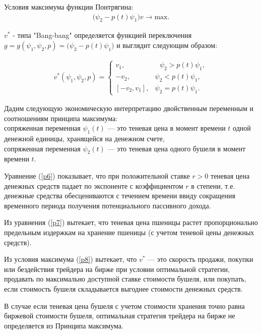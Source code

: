 {Условия максимума функции Понтрягина:
\begin{align}
     \big (\psi_{2} - p(t)\psi_{1}\big )v \to \mathrm{max}.
\end{align}


${v^*}$ - типа "Bang-bang" определяется функцией переключения\\
$g = g(\psi_1 , \psi_2, p)= \big (\psi_{2} - p(t)\psi_{1} \big)$ и выглядит следующим образом:

\begin{align}
v^*(\psi_1 , \psi_2, p) = 
 \begin{cases}
   v_{1}, &\text{ $\psi_{2} > p(t)\psi_{1}$},\\
   -v_{2}, &\text{$\psi_{2} < p(t)\psi_{1}$},\\
   [-v_{2},v_{1}], &\text{$\psi_{2} = p(t)\psi_{1}$}.
 \end{cases}\label{p8}
\end{align} 


Дадим следующую экономическую интерпретацию двойственным переменным и соотношениям принципа максимума:\\
 сопряженная переменная $ \psi_1(t) $ --- это теневая цена в момент времени ${t}$ одной денежной единицы, хранящейся на денежном счете,\\
 сопряженная переменная $ \psi_2(t) $ --- это теневая цена одного бушеля в момент времени ${t}$.
 
 
Уравнение (\ref{p6}) показывает, что при положительной ставке $ r>0 $ теневая цена денежных средств падает по экспоненте с коэффициентом $r$ в степени, т.е.  денежные средства обесцениваются с течением времени ввиду сокращения временного периода получения потенциального пассивного дохода.


Из уравнения (\ref{p7}) вытекает, что теневая цена пшеницы растет пропорционально предельным издержкам на хранение пшеницы (с учетом теневой цены денежных средств).


Из условия максимума (\ref{p8})  вытекает, что  ${v^*}$ --- это скорость продажи, покупки или бездействия трейдера на бирже при условии оптимальной стратегии, продавать по максимально доступной  ставке стоимости бушеля, или покупать, если стоимость бушеля складывается выгоднее стоимости денежных средств.


В случае если теневая цена бушеля с учетом стоимости хранения точно равна биржевой стоимости бушеля, оптимальная стратегия трейдера на бирже не определяется из Принципа максимума.

}
